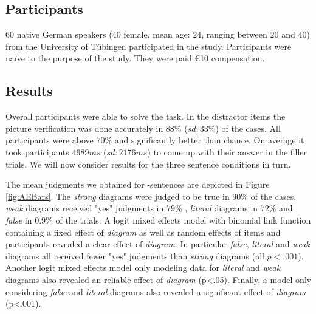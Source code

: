 \documentclass[fleqn,reqno,10pt,draft]{article}
\newcommand{\as}{\acro{as}}
\begin{document}
\subsection{Participants}
60 native German speakers (40 female, mean age: $24$, ranging between $20$ and $40$) from the University of T{\"u}bingen participated in the study. Participants were na\"ive to the purpose of the study. They were paid \euro{10} compensation. 

\subsection{Results}
Overall participants were able to solve the task. In the distractor items the picture verification was done accurately in $88\%$ ($sd: 33\%$) of the cases. All participants were above $70\%$ and significantly better than chance. On average it took participants $4989ms$ ($sd:2176ms$) to come up with their answer in the filler trials. We will now consider results for the three sentence conditions in turn.

The mean judgments we obtained for \as-sentences are depicted in Figure \ref{fig:AEBars}. The {\it strong} diagrams were judged to be true in $90\%$ of the cases, {\it weak} diagrams received "yes" judgments in $79\%$ , {\it literal} diagrams in  $72\%$  and {\it false} in $0.9\%$ of the trials.  A logit mixed effects model with binomial link function containing a fixed effect of {\it diagram} as well as random effects of items and participants revealed a clear effect of {\it diagram}. In particular {\it false}, {\it literal} and {\it weak} diagrams all received fewer "yes" judgments than {\it strong} diagrams (all $p<.001$).  Another logit mixed effects model only modeling data for {\it literal} and {\it weak} diagrams also revealed an reliable effect of {\it diagram} (p<.05). Finally, a model only considering  {\it false} and {\it literal} diagrams also revealed a significant effect of {\it diagram} (p<.001).
\end{document}
